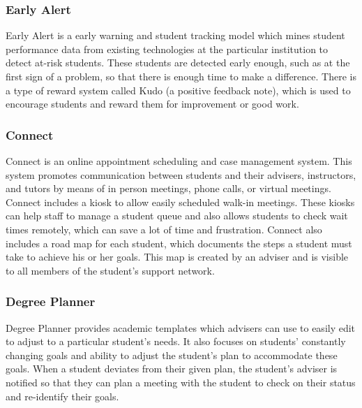 \subsubsection{Early Alert}
Early Alert is a early warning and student tracking model which mines student performance data from existing technologies at the particular institution to detect at-risk students. These students are detected early enough, such as at the first sign of a problem, so that there is enough time to make a difference. There is a type of reward system called Kudo (a positive feedback note), which is used to encourage students and reward them for improvement or good work. 
\subsubsection{Connect}
Connect is an online appointment scheduling and case management system. This system promotes communication between students and their advisers, instructors, and tutors by means of in person meetings, phone calls, or virtual meetings. Connect includes a kiosk to allow easily scheduled walk-in meetings. These kiosks can help staff to manage a student queue and also allows students to check wait times remotely, which can save a lot of time and frustration. Connect also includes a road map for each student, which documents the steps a student must take to achieve his or her goals. This map is created by an adviser and is visible to all members of the student's support network. 
\subsubsection{Degree Planner}
Degree Planner provides academic templates which advisers can use to easily edit to adjust to a particular student's needs. It also focuses on students' constantly changing goals and ability to adjust the student's plan to accommodate these goals. When a student deviates from their given plan, the student's adviser is notified so that they can plan a meeting with the student to check on their status and re-identify their goals. 


